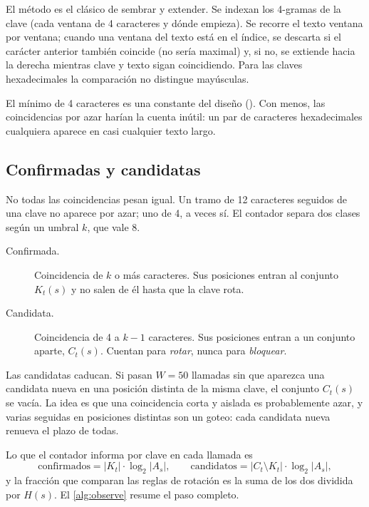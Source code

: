 El método es el clásico de sembrar y extender. Se indexan los 4-gramas de la clave (cada ventana de 4
caracteres y dónde empieza). Se recorre el texto ventana por ventana; cuando una ventana del texto
está en el índice, se descarta si el carácter anterior también coincide (no sería maximal) y, si no,
se extiende hacia la derecha mientras clave y texto sigan coincidiendo. Para las claves hexadecimales
la comparación no distingue mayúsculas.

El mínimo de 4 caracteres es una constante del diseño (). Con menos, las
coincidencias por azar harían la cuenta inútil: un par de caracteres hexadecimales cualquiera aparece
en casi cualquier texto largo.

\subsection{Confirmadas y candidatas}\label{sec:confirmadas}

No todas las coincidencias pesan igual. Un tramo de 12 caracteres seguidos de una clave no aparece por
azar; uno de 4, a veces sí. El contador separa dos clases según un umbral $k$, que vale 8.

\begin{description}
  \item[Confirmada.] Coincidencia de $k$ o más caracteres. Sus posiciones entran al conjunto
    $K_t(s)$ y no salen de él hasta que la clave rota.
  \item[Candidata.] Coincidencia de 4 a $k-1$ caracteres. Sus posiciones entran a un conjunto aparte,
    $C_t(s)$. Cuentan para \emph{rotar}, nunca para \emph{bloquear}.
\end{description}

Las candidatas caducan. Si pasan $W = 50$ llamadas sin que aparezca una candidata nueva en una
posición distinta de la misma clave, el conjunto $C_t(s)$ se vacía. La idea es que una coincidencia
corta y aislada es probablemente azar, y varias seguidas en posiciones distintas son un goteo: cada
candidata nueva renueva el plazo de todas.

Lo que el contador informa por clave en cada llamada es
\begin{equation}
  \text{confirmados} = |K_t| \cdot \log_2|A_s| , \qquad
  \text{candidatos} = |C_t \setminus K_t| \cdot \log_2|A_s| ,
  \label{eq:conf-cand}
\end{equation}
y la fracción que comparan las reglas de rotación es la suma de los dos dividida por $H(s)$. El
\cref{alg:observe} resume el paso completo.

